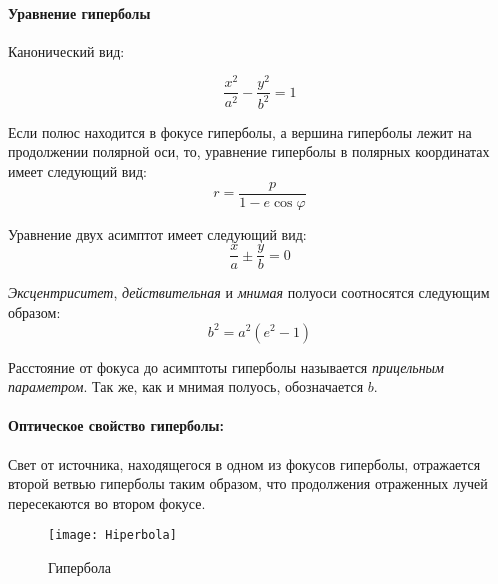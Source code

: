 \paragraph{Уравнение гиперболы}
\begin{flushleft}
Канонический вид:
\end{flushleft}

\begin{equation}
\frac{x^2}{a^2}-\frac{y^2}{b^2}=1
\end{equation}

Если полюс находится в фокусе гиперболы, а вершина гиперболы лежит на продолжении полярной оси, то, уравнение гиперболы в полярных координатах имеет следующий вид:
\begin{equation}
r=\frac{p}{1-e\cos\varphi}
\end{equation}

Уравнение двух асимптот имеет следующий вид:
\begin{equation}
\frac{x}{a}\pm\frac{y}{b}=0
\end{equation}

\textit{Эксцентриситет}, \textit{действительная} и \textit{мнимая} полуоси соотносятся следующим образом:
\begin{equation}
b^2=a^2(e^2-1)
\end{equation}

Расстояние от фокуса до асимптоты гиперболы называется \textit{прицельным параметром}. Так же, как и мнимая полуось, обозначается $b$.
\paragraph{Оптическое свойство гиперболы:}

Свет от источника, находящегося в одном из фокусов гиперболы, отражается второй ветвью гиперболы таким образом, что продолжения отраженных лучей пересекаются во втором фокусе.
\begin{figure}[h!]
\centering
\texttt{[image: Hiperbola]}
\caption{Гипербола \label{pic:the-pic}}
\end{figure}